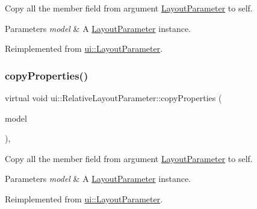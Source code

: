 Copy all the member field from argument \hyperlink{classui_1_1LayoutParameter}{Layout\+Parameter} to self. 
\begin{DoxyParams}{Parameters}
{\em model} & A \hyperlink{classui_1_1LayoutParameter}{Layout\+Parameter} instance. \\
\hline
\end{DoxyParams}


Reimplemented from \hyperlink{classui_1_1LayoutParameter_af4c1b163c31ac6244902610334ead73f}{ui\+::\+Layout\+Parameter}.

\mbox{\label{classui_1_1RelativeLayoutParameter_a370cb1f399839e47fcc471d8dfc7fffc}} 
\subsubsection{\texorpdfstring{copy\+Properties()}{copyProperties()}\hspace{0.1cm}{\footnotesize\ttfamily [2/2]}}
{\footnotesize\ttfamily virtual void ui\+::\+Relative\+Layout\+Parameter\+::copy\+Properties (\begin{DoxyParamCaption}\item[{\hyperlink{classui_1_1LayoutParameter}{Layout\+Parameter} $\ast$}]{model }\end{DoxyParamCaption})\hspace{0.3cm}{\ttfamily [override]}, {\ttfamily [virtual]}}

Copy all the member field from argument \hyperlink{classui_1_1LayoutParameter}{Layout\+Parameter} to self. 
\begin{DoxyParams}{Parameters}
{\em model} & A \hyperlink{classui_1_1LayoutParameter}{Layout\+Parameter} instance. \\
\hline
\end{DoxyParams}


Reimplemented from \hyperlink{classui_1_1LayoutParameter_af4c1b163c31ac6244902610334ead73f}{ui\+::\+Layout\+Parameter}.

\mbox{\label{classui_1_1RelativeLayoutParameter_a6202a08e1d8315adba9ea01c5dd22de0}} 
